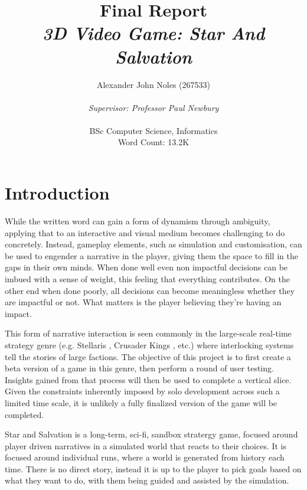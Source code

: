 \documentclass{report}
\begin{document}
\title{
Final Report \\ 
\textit{3D Video Game: Star And Salvation} }
\author{Alexander John Noles (267533)\\ \\
\textit{Supervisor: Professor Paul Newbury} \\ \\
BSc Computer Science, Informatics \\ 
Word Count: 13.2K}

\maketitle

\tableofcontents

\chapter{Introduction}
While the written word can gain a form of dynamism through ambiguity, applying that to an interactive and visual medium becomes challenging to do concretely. Instead, gameplay elements, such as simulation and customisation, can be used to engender a narrative in the player, giving them the space to fill in the gaps in their own minds. When done well even non impactful decisions can be imbued with a sense of weight, this feeling that everything contributes. On the other end when done poorly, all decisions can become meaningless whether they are impactful or not. What matters is the player believing they're having an impact. 

This form of narrative interaction is seen commonly in the large-scale real-time strategy genre (e.g. Stellaris \cite{stellaris}, Crusader Kings \cite{crusaderkings}, etc.) where interlocking systems tell the stories of large factions. The objective of this project is to first create a beta version of a game in this genre, then perform a round of user testing. Insights gained from that process will then be used to complete a vertical slice. Given the constraints inherently imposed by solo development across such a limited time scale, it is unlikely a fully finalized version of the game will be completed.

Star and Salvation is a long-term, sci-fi, sandbox stratergy game, focused around player driven narratives in a simulated world that reacts to their choices. It is focused around individual runs, where a world is generated from history each time. There is no direct story, instead it is up to the player to pick goals based on what they want to do, with them being guided and assisted by the simulation.
\end{document}
